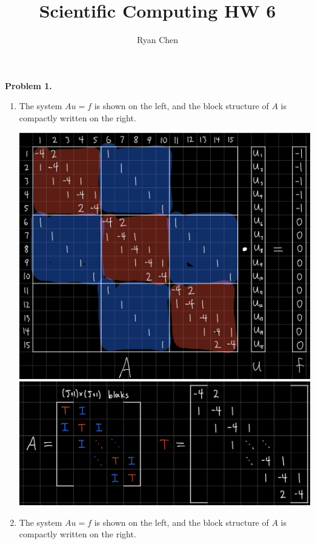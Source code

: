 \documentclass{article}
\title{Scientific Computing HW 6}
\author{Ryan Chen}
\def\tbf#1{\textbf{#1}}
\begin{document}
	
\maketitle



\tbf{Problem 1.}

\begin{enumerate}[label=(\alph*)]
	
\item The system $Au=f$ is shown on the left, and the block structure of $A$ is compactly written on the right.

\includegraphics[scale=.1]{hw6 a full}
\includegraphics[scale=.09]{hw6 a block}


\item The system $Au=f$ is shown on the left, and the block structure of $A$ is compactly written on the right.


\end{enumerate}
\end{document}
